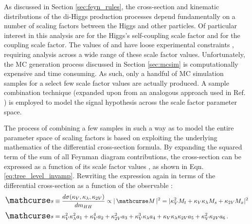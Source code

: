     As discussed in Section \ref{sec:feyn_rules},
        the cross-section and kinematic distributions of the di-Higgs production processes
        depend fundamentally on a number of scaling factors between the Higgs and other particles.
    Of particular interest in this analysis are \kl for the Higgs's self-coupling scale factor and \kvv for the \HHVV coupling scale factor.
    The values of \kl and \kvv have loose experimental constraints \cite{EXOT-2016-31} \cite{HDBS-2018-18-witherratum} \cite{ATLAS-CONF-2019-049},
        requiring analysis across a wide range of these scale factor values.
    Unfortunately, the MC generation process discussed in Section \ref{sec:mcsim} is computationally expensive and time consuming.
    As such, only a handful of MC simulation samples for a select few scale factor values are actually produced.
    A sample combination technique 
        (expanded upon from an analogous approach used in Ref. \cite{combination_origin})
        is employed to model the signal hypothesis across the scale factor parameter space.

    The process of combining a few samples in such a way as to model the entire parameter space of scaling factors
        is based on exploiting the underlying mathematics of the differential cross-section formula.
    By expanding the squared term of the sum of all Feynman diagram contributions,
        the cross-section can be expressed as a function of its scale factor values \cite{ATLAS-CONF-2019-049},
        as shown in Eqn. \ref{eq:tree_level_invamp}.
    Rewriting the expression again in terms of the differential cross-section as a function of the observable \mhh:
    \begin{equation} \begin{split} \label{eq:tree_level_invamp_simple}
        \xsec &\equiv \dXsecM \propto |\invAmp|^2 = |  \kv^2 M_t + \kv \kl M_s + \kvv M_x |^2 \\
        \xsec &= \kv^2 \kl^2 a_1 + \kv^4 a_2 + \kvv^2 a_3 + \kv^3 \kl a_4 + \kv \kl \kvv a_5 + \kv^2 \kvv a_6
        \,.
    \end{split} \end{equation}

    \newcommand{\crossterm}[1]{
        \xsec_{#1} &= \fkv{#1}^2 \fkl{#1}^2 a_1
            + \fkv{#1}^4 a_2
            + \fkvv{#1}^2 a_3
            + \fkv{#1}^3 \fkl{#1} a_4
            + \fkv{#1} \fkl{#1} \fkvv{#1} a_5
            + \fkv{#1}^2 \fkvv{#1} a_6
    }
    \newcommand{\combterm}[1]{ g_{#1} \xsec_{#1} }

